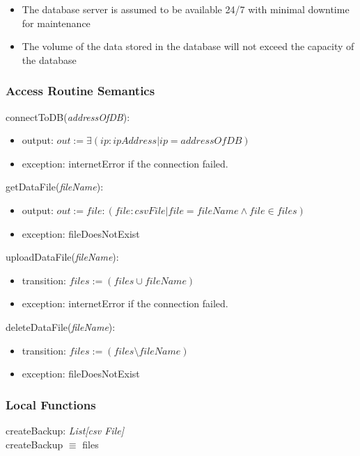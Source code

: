 \documentclass[12pt, titlepage]{article}
\begin{document}
\begin{itemize}
\begin{itemize}
  \item The database server is assumed to be available 24/7 with minimal downtime for maintenance 
  \item The volume of the data stored in the database will not exceed the capacity of the database
\end{itemize}

\subsubsection{Access Routine Semantics}

\noindent connectToDB(\textit{addressOfDB}):
\begin{itemize}
\item output: $out := \mathit{\exists( ip: ipAddress|ip=addressOfDB)}$
\item exception: internetError if the connection failed.
\end{itemize}

\noindent getDataFile(\textit{fileName}):
\begin{itemize}
\item output: \(out := file: (file: csv File|file=fileName \land file \in files)\)
\item exception: fileDoesNotExist
\end{itemize}

\noindent uploadDataFile(\textit{fileName}):
\begin{itemize}
\item transition: \(files := (files \cup fileName)\)
\item exception: internetError if the connection failed.
\end{itemize}

\noindent deleteDataFile(\textit{fileName}):
\begin{itemize}
\item transition: \(files := (files \setminus fileName)\)
\item exception: fileDoesNotExist
\end{itemize}

\subsubsection{Local Functions}
\noindent createBackup:  \textit{List[csv File]} \\
\noindent createBackup $\equiv$ files




\end{itemize}
\end{document}
